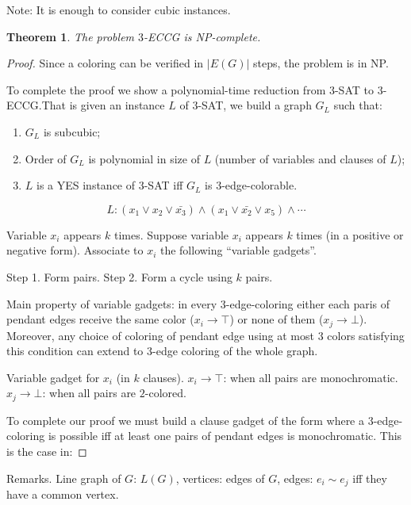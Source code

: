 \documentclass[12pt,a4paper]{article}
\newtheorem{theorem}{Theorem}
\begin{document}
Note: It is enough to consider cubic instances.

\begin{theorem}
  The problem \(3\)-ECCG is NP-complete.
\end{theorem}

\begin{proof}
  Since a coloring can be verified in \(|E(G)|\) steps, the problem is in NP.\@

  To complete the proof we show a polynomial-time reduction from \(3\)-SAT to
  \(3\)-ECCG.\@ That is given an instance \(L\) of \(3\)-SAT, we build a graph
  \(G_L\) such that:

  \begin{enumerate}
  \item \(G_L\) is subcubic;
  \item Order of \(G_L\) is polynomial in size of \(L\) (number of variables and
    clauses of \(L\));
  \item \(L\) is a YES instance of \(3\)-SAT iff \(G_L\) is
    \(3\)-edge-colorable.
  \end{enumerate}

  \[L: (x_1 \vee x_2 \vee \bar{x_3}) \wedge (x_1 \vee \bar{x_2} \vee x_5)
    \wedge \cdots\]

  Variable \(x_i\) appears \(k\) times. Suppose variable \(x_i\) appears \(k\)
  times (in a positive or negative form).  Associate to \(x_i\) the following
  \enquote{variable gadgets}.

  Step 1. Form pairs.
  Step 2. Form a cycle using \(k\) pairs.


  Main property of variable gadgets: in every \(3\)-edge-coloring either each
  paris of pendant edges receive the same color (\(x_i \to \top\)) or none of
  them (\(x_j \to \bot\)).  Moreover, any choice of coloring of pendant edge
  using at most \(3\) colors satisfying this condition can extend to \(3\)-edge
  coloring of the whole graph.

  Variable gadget for \(x_i\) (in \(k\) clauses).
  \(x_i \to \top\): when all pairs are monochromatic.
  \(x_j \to \bot\): when all pairs are \(2\)-colored.

  To complete our proof we must build a clause gadget of the form where a
  \(3\)-edge-coloring is possible iff at least one pairs of pendant edges is
  monochromatic. This is the case in:
\end{proof}

Remarks.  Line graph of \(G\): \(L(G)\), vertices: edges of \(G\), edges: \(e_i
\sim e_j\) iff they have a common vertex.
\end{document}
